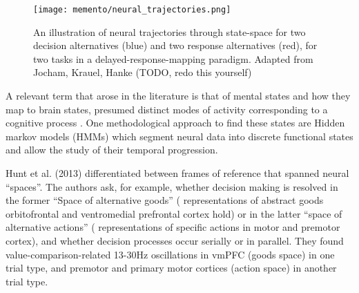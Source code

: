 \begin{figure}
	\centering
	\texttt{[image: memento/neural\_trajectories.png]}
	\caption[Neural trajectories]{An illustration of neural trajectories through state-space for two decision alternatives (blue) and two response alternatives (red), for two tasks in a delayed-response-mapping paradigm.  Adapted from Jocham, Krauel, Hanke (TODO, redo this yourself)}
	\label{fig:trajectories}
\end{figure}




A relevant term that arose in the literature is that of mental states and how they map to brain states, presumed distinct modes of activity corresponding to a cognitive process \citep{haynes2015information}.
One methodological approach to find these states are Hidden markov models (HMMs) which segment neural data into discrete functional states and allow the study of their temporal progression.





Hunt et al. (2013) differentiated between frames of reference that spanned neural ``spaces''.
The authors ask, for example, whether decision making is resolved in the former “Space of alternative goods” ( representations of abstract goods orbitofrontal and ventromedial prefrontal cortex hold) or in the latter “space of alternative actions” ( representations of specific actions in motor and premotor cortex), and whether decision processes occur serially or in parallel. They found value-comparison-related 13-30Hz oscillations in vmPFC (goods space) in one trial type, and premotor and primary motor cortices (action space) in another trial type.

